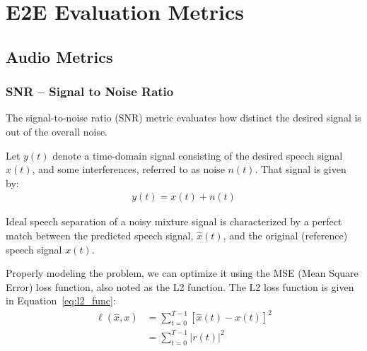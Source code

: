 \chapter{E2E Evaluation Metrics}\label{ch:metrics}
\section{Audio Metrics}
\subsection{SNR -- Signal to Noise Ratio}
The signal-to-noise ratio (SNR) metric evaluates how
distinct the desired signal is out of the overall noise.

Let \(y(t)\) denote a time-domain signal consisting of
the desired speech signal \(x(t)\), and some interferences,
referred to as noise \(n(t)\).
That signal is given by:
\begin{align}
    y(t) = x(t) + n(t)
\end{align}


Ideal speech separation of a noisy mixture signal is characterized by
a perfect match between the predicted speech signal, \(\widehat{x}(t)\), 
and the original (reference) speech signal \(x(t)\).


Properly modeling the problem,
we can optimize it using the 
MSE (Mean Square Error) loss function,
also noted as the L2 function.
The L2 loss function is given in Equation~\ref{eq:l2_func}:
\begin{align}\label{eq:l2_func}
    \ell(\widehat{x}, x) & = \sum_{t=0}^{T-1} \left[\widehat{x}(t) - x(t)\right]^{2} \\
    & = \sum_{t=0}^{T-1} |r(t)|^{2}
\end{align}



